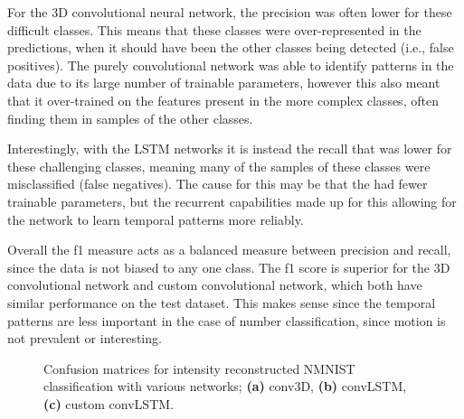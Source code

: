 For the 3D convolutional neural network, the precision was often lower for these difficult classes. This means that these classes were over-represented in the predictions, when it should have been the other classes being detected (i.e., false positives). The purely convolutional network was able to identify patterns in the data due to its large number of trainable parameters, however this also meant that it over-trained on the features present in the more complex classes, often finding them in samples of the other classes.

Interestingly, with the LSTM networks it is instead the recall that was lower for these challenging classes, meaning many of the samples of these classes were misclassified (false negatives). The cause for this may be that the had fewer trainable parameters, but the recurrent capabilities made up for this allowing for the network to learn temporal patterns more reliably.

Overall the f1 measure acts as a balanced measure between precision and recall, since the data is not biased to any one class. The f1 score is superior for the 3D convolutional network and custom convolutional network, which both have similar performance on the test dataset. This makes sense since the temporal patterns are less important in the case of number classification, since motion is not prevalent or interesting.

\begin{figure}[htb]%
    \centering
    \qquad
    \qquad
    \caption{Confusion matrices for intensity reconstructed NMNIST classification with various networks; \textbf{(a)} conv3D, \textbf{(b)} convLSTM, \textbf{(c)} custom convLSTM.}%
    \label{fig:nmnist_recon_c_matrices}%
\end{figure}


